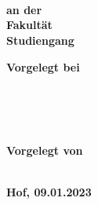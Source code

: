 \begin{titlepage}
        \center
        \textbf{\Large \mytitle}\\[0.5cm]
        \textbf{\large \mysubtitle}\\[0.5cm]

    \vspace{3cm}
    \textbf{\Large \textls{\mydoctype}}\\[0.8cm]
    \textbf{an der \myuniname\\
    Fakultät \myfaculty\\
    Studiengang \mycourse}\\[0.5cm]
    \vfill\vfill\vfill

        \begin{minipage}{0.4\textwidth}
            \begin{flushleft}
                \textbf{Vorgelegt bei\\
                \mydocent{}\\
                \myunistreet{} \myuninumber{}\\
                \myunizip{} \myuniplace{}
                }
            \end{flushleft}
        \end{minipage}
~
    \begin{minipage}{0.4\textwidth}
        \begin{flushright}
            \textbf{
            Vorgelegt von\\
            \myname \\
            }
        \end{flushright}
    \end{minipage}
    \vfill
    \textbf{Hof, 09.01.2023}


\end{titlepage}
\restoregeometry